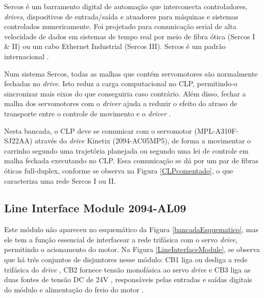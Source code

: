 Sercos é um barramento digital de automação que interconecta controladores, \textit{drives}, dispositivos de entrada/saída e atuadores para máquinas e sistemas controlados numericamente. Foi projetado para comunicação serial de alta velocidade de dados em sistemas de tempo real por meio de fibra ótica (Sercos I \& II) ou um cabo Ethernet Industrial (Sercos III). Sercos é um padrão internacional \cite{sercos}.

Num sistema Sercos, todas as malhas que contém servomotores são normalmente fechadas no \textit{drive}. Isto reduz a carga computacional no CLP, permitindo-o sincronizar mais eixos do que conseguiria caso contrário. Além disso, fechar a malha dos servomotores com o \textit{driver} ajuda a reduzir o efeito do atraso de transporte entre o controle de movimento e o \textit{driver} \cite{sercos}.

Nesta bancada, o CLP deve se comunicar com o servomotor (MPL-A310F-SJ22AA) através do \textit{drive} Kinetix (2094-AC05MP5), de forma a movimentar o carrinho segundo uma trajetória planejada ou segundo uma lei de controle em malha fechada executando no CLP. Essa comunicação se dá por um par de fibras óticas full-duplex, conforme se observa na Figura \ref{CLPcomentado}, o que caracteriza uma rede Sercos I ou II.

\subsection{Line Interface Module 2094-AL09}

Este módulo não apareceu no esquemático da Figura \ref{bancadaEsquematico}, mas ele tem a função essencial de interfacear a rede trifásica com o servo \textit{drive}, permitindo o acionamento do motor. Na Figura \ref{LineInterfaceModule}, se observa que há três conjuntos de disjuntores nesse módulo: CB1 \textendash{} liga ou desliga a rede trifásica do \textit{drive}  \textendash{}, CB2 \textendash{} fornece tensão monofásica ao servo \textit{drive} \textendash{} e CB3 \textendash{} liga as duas fontes de tensão DC de 24V \textendash{}, responsáveis pelas entradas e saídas digitais do módulo e alimentação do freio do motor \cite{redytton}.

